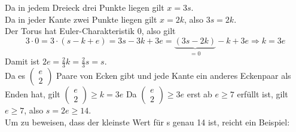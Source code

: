 \begin{problem*}[1]
Da in jedem Dreieck drei Punkte liegen gilt $ x = 3s $. \\
Da in jeder Kante zwei Punkte liegen gilt $ x = 2k $, also $ 3s = 2k $.\\
Der Torus hat Euler-Charakteristik $ 0 $, also gilt
\begin{equation*}
  3 \cdot 0 = 3 \cdot (s - k + e) = 3s - 3k +3e = \underbrace{ (3s -2k) }_{ = 0 } - k + 3e \Rightarrow k = 3e
\end{equation*}
Damit ist $ 2e = \frac{2}{3} k = \frac{2}{3} s = s $. \\
Da es $(\begin{smallmatrix}
  e\\
  2  
\end{smallmatrix})$
Paare von Ecken gibt und jede Kante ein anderes Eckenpaar als Enden hat, gilt 
$(\begin{smallmatrix}
  e\\
  2  
\end{smallmatrix}) \geq k = 3e $
Da $(\begin{smallmatrix}
  e \\
  2
\end{smallmatrix}) \geq 3e$ erst ab $ e \geq 7 $ erfüllt ist, gilt $ e \geq 7 $, also $ s = 2e \geq 14 $.\\
Um zu beweisen, dass der kleinste Wert für s genau 14 ist, reicht ein Beispiel: 
\end{problem*}
